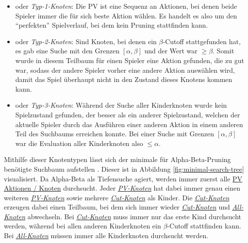 \vspace*{-5cm}

\pagebreak

\begin{itemize}
    \item {} oder \emph{Typ-1-Knoten}: Die \ac{PV} ist eine Sequenz an Aktionen, bei denen beide Spieler immer die für sich beste Aktion wählen. Es handelt es also um den \enquote{perfekten} Spielverlauf, bei dem kein Pruning stattfinden kann. \cite[S. 316f.]{2005.EnhancedForwardPruning}
    \item \vspace*{-0.125cm}  oder \emph{Typ-2-Knoten}: Sind Knoten, bei denen ein $\beta$-Cutoff stattgefunden hat, \dash es gab eine Suche mit den Grenzen $\left[\alpha, \beta\right]$ und der Wert war $\ge \beta$. Somit wurde in diesem Teilbaum für einen Spieler eine Aktion gefunden, die zu gut war, sodass der andere Spieler vorher eine andere Aktion auswählen wird, damit das Spiel überhaupt nicht in den Zustand dieses Knotens kommen kann. \cite[S. 324]{1975.AlphaBeta}
    \item \vspace*{-0.125cm}  oder \emph{Typ-3-Knoten}: Während der Suche aller Kinderknoten wurde kein Spielzustand gefunden, der besser als ein anderer Spielzustand, welchen der aktuelle Spieler durch das Ausführen einer anderen Aktion in einem anderen Teil des Suchbaums erreichen konnte. Bei einer Suche mit Grenzen $\left[\alpha, \beta\right]$ war die Evaluation aller Kinderknoten also $\le \alpha$. \cite[S. 446]{1985.ParallelAlphaBeta}
\end{itemize}

\vspace*{-0.13cm}

Mithilfe dieser Knotentypen lässt sich der minimale für Alpha-Beta-Pruning benötigte Suchbaum aufstellen \cite[S. 8]{1991.SingleAgentGameTreeSearch}. Dieser ist in Abbildung \ref{fig:minimal-search-tree} visualisiert. Da Alpha-Beta als Tiefensuche agiert, werden immer zuerst alle \hyperref[text:pv-node]{\acs{PV} Aktionen / Knoten} durchsucht. Jeder \hyperref[text:pv-node]{\emph{\acs{PV}-Knoten}} hat dabei immer genau einen weiteren \hyperref[text:pv-node]{\emph{\acs{PV}-Knoten}} sowie mehrere \hyperref[text:cut-node]{\emph{Cut-Knoten}} als Kinder. Die \hyperref[text:cut-node]{\emph{Cut-Knoten}} erzeugen dabei einen Teilbaum, bei dem sich immer wieder \hyperref[text:cut-node]{\emph{Cut-Knoten}} und \hyperref[text:all-node]{\emph{All-Knoten}} abwechseln. Bei \hyperref[text:cut-node]{\emph{Cut-Knoten}} muss immer nur das erste Kind durchsucht werden, während bei allen anderen Kinderknoten ein $\beta$-Cutoff stattfinden kann. Bei \hyperref[text:all-node]{\emph{All-Knoten}} müssen immer alle Kinderknoten durchsucht werden.

